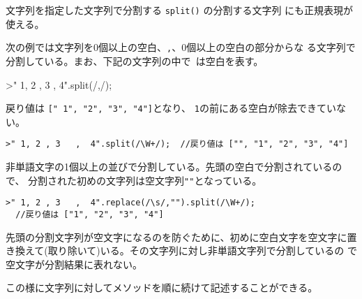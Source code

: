  \begin{Exec}\upshape
 文字列を指定した文字列で分割する \Verb+split()+ の分割する文字列
       にも正規表現が使える。

次の例では文字列を$0$個以上の空白、\Verb+,+、$0$個以上の空白の部分からな
	る文字列で分割している。まお、下記の文字列の中で\protect\verb*+ +は空白を表す。
\begin{Verbatim*}
>" 1, 2 , 3   ,  4".split(/\s*,\s*/);
\end{Verbatim*}
	戻り値は \Verb+[+\Verb*+" 1",+\Verb+ "2", "3", "4"]+となり、
	\Verb+1+の前にある空白が除去できていない。
\begin{Verbatim}
>" 1, 2 , 3   ,  4".split(/\W+/);  //戻り値は ["", "1", "2", "3", "4"]
\end{Verbatim}
非単語文字の1個以上の並びで分割している。先頭の空白で分割されているので、
 分割された初めの文字列は空文字列\Verb+""+となっている。
\begin{Verbatim}
>" 1, 2 , 3   ,  4".replace(/\s/,"").split(/\W+/);
  //戻り値は ["1", "2", "3", "4"]
\end{Verbatim}
先頭の分割文字列が空文字になるのを防ぐために、初めに空白文字を空文字に置
 き換えて(取り除いて)いる。その文字列に対し非単語文字列で分割しているの
 で空文字が分割結果に表れない。

       この様に文字列に対してメソッドを順に続けて記述することができる。
 \end{Exec}




